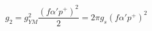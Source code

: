 \begin{equation}
g_2= g_{YM}^2\frac{ \left( f\alpha' p^+\right)^2}{2}=
2\pi g_s \left( f\alpha' p^+\right)^2
\label{g21}
\end{equation}

